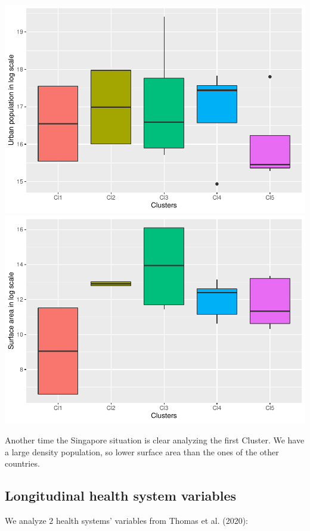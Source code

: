 \documentclass[
  6pt,
]{article}
\begin{document}
\includegraphics[width=.5\textwidth]{Report_SC_Group3_files/figure-latex/unnamed-chunk-11-1.pdf}
\includegraphics[width=.5\textwidth]{Report_SC_Group3_files/figure-latex/unnamed-chunk-11-2.pdf}

Another time the Singapore situation is clear analyzing the first
Cluster. We have a large density population, so lower surface area than
the ones of the other countries.

\hypertarget{longitudinal-health-system-variables}{%
\subsection{Longitudinal health system
variables}\label{longitudinal-health-system-variables}}

We analyze \(2\) health systems' variables from Thomas et al. (2020):
\end{document}
